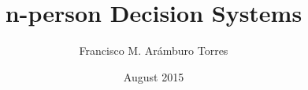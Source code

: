 \documentclass{article}
\title{n-person Decision Systems}
\author{Francisco M. Arámburo Torres}
\date{August 2015}
\begin{document}
\maketitle

\begin{abstract}

\end{abstract}










\end{document}
